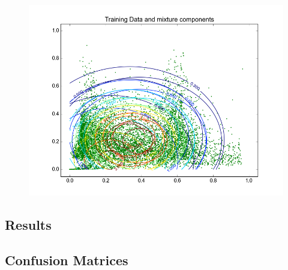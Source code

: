 \documentclass[11pt,a4paper]{article}
\begin{document}
\begin{minipage}[b]{0.25\textwidth}
\begin{figure}[H]
  \centering
  \includegraphics[width=.8\linewidth]{Figures/contours_diagstreet30.png}

  \label{fig:sfig1}
\end{figure}%
\end{minipage}
\subsection{Results}

\subsection{Confusion Matrices}
\end{document}
